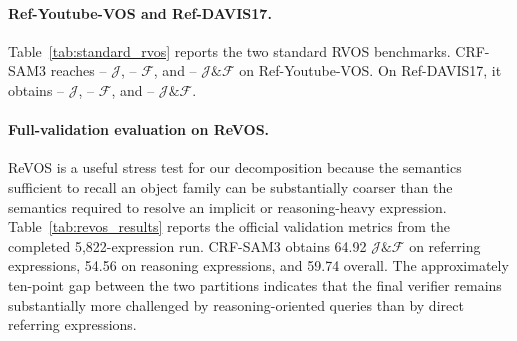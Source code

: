 \paragraph{Ref-Youtube-VOS and Ref-DAVIS17.}
Table~\ref{tab:standard_rvos} reports the two standard RVOS benchmarks. CRF-SAM3 reaches -- $\mathcal{J}$, -- $\mathcal{F}$, and -- $\mathcal{J}\&\mathcal{F}$ on Ref-Youtube-VOS. On Ref-DAVIS17, it obtains -- $\mathcal{J}$, -- $\mathcal{F}$, and -- $\mathcal{J}\&\mathcal{F}$.

\begin{table}[t]
\centering
\setlength{\tabcolsep}{5.2pt}
\renewcommand{\arraystretch}{1.08}
\caption{Comparison with representative prior work on Ref-Youtube-VOS and Ref-DAVIS17. The table is intended to position CRF-SAM3 among closely related RVOS paradigms rather than provide an exhaustive leaderboard of concurrent systems.}
\label{tab:standard_rvos}
\end{table}

\paragraph{Full-validation evaluation on ReVOS.}
ReVOS is a useful stress test for our decomposition because the semantics sufficient to recall an object family can be substantially coarser than the semantics required to resolve an implicit or reasoning-heavy expression. Table~\ref{tab:revos_results} reports the official validation metrics from the completed 5,822-expression run. CRF-SAM3 obtains 64.92 $\mathcal{J}\&\mathcal{F}$ on referring expressions, 54.56 on reasoning expressions, and 59.74 overall. The approximately ten-point gap between the two partitions indicates that the final verifier remains substantially more challenged by reasoning-oriented queries than by direct referring expressions.

